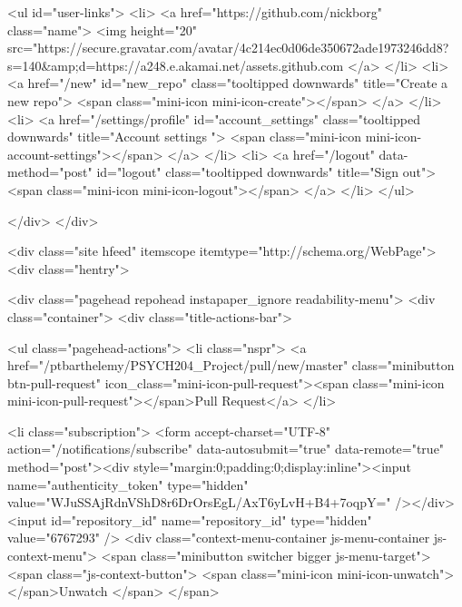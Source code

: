             

  
    <ul id="user-links">
      <li>
        <a href="https://github.com/nickborg" class="name">
          <img height="20" src="https://secure.gravatar.com/avatar/4c214ec0d06de350672ade1973246dd8?s=140&amp;d=https://a248.e.akamai.net/assets.github.com%
        </a>
      </li>
      <li>
        <a href="/new" id="new_repo" class="tooltipped downwards" title="Create a new repo">
          <span class="mini-icon mini-icon-create"></span>
        </a>
      </li>
      <li>
        <a href="/settings/profile" id="account_settings"
          class="tooltipped downwards"
          title="Account settings ">
          <span class="mini-icon mini-icon-account-settings"></span>
        </a>
      </li>
      <li>
          <a href="/logout" data-method="post" id="logout" class="tooltipped downwards" title="Sign out">
            <span class="mini-icon mini-icon-logout"></span>
          </a>
      </li>
    </ul>



            
          </div>
        </div>


      

      


            <div class="site hfeed" itemscope itemtype="http://schema.org/WebPage">
      <div class="hentry">
        
        <div class="pagehead repohead instapaper_ignore readability-menu">
          <div class="container">
            <div class="title-actions-bar">
              


                  <ul class="pagehead-actions">
          <li class="nspr">
            <a href="/ptbarthelemy/PSYCH204_Project/pull/new/master" class="minibutton btn-pull-request" icon_class="mini-icon-pull-request"><span class="mini-icon mini-icon-pull-request"></span>Pull Request</a>
          </li>

          <li class="subscription">
              <form accept-charset="UTF-8" action="/notifications/subscribe" data-autosubmit="true" data-remote="true" method="post"><div style="margin:0;padding:0;display:inline"><input name="authenticity_token" type="hidden" value="WJuSSAjRdnVShD8r6DrOrsEgL/AxT6yLvH+B4+7oqpY=" /></div>  <input id="repository_id" name="repository_id" type="hidden" value="6767293" />
  <div class="context-menu-container js-menu-container js-context-menu">
    <span class="minibutton switcher bigger js-menu-target">
      <span class="js-context-button">
          <span class="mini-icon mini-icon-unwatch"></span>Unwatch
      </span>
    </span>

